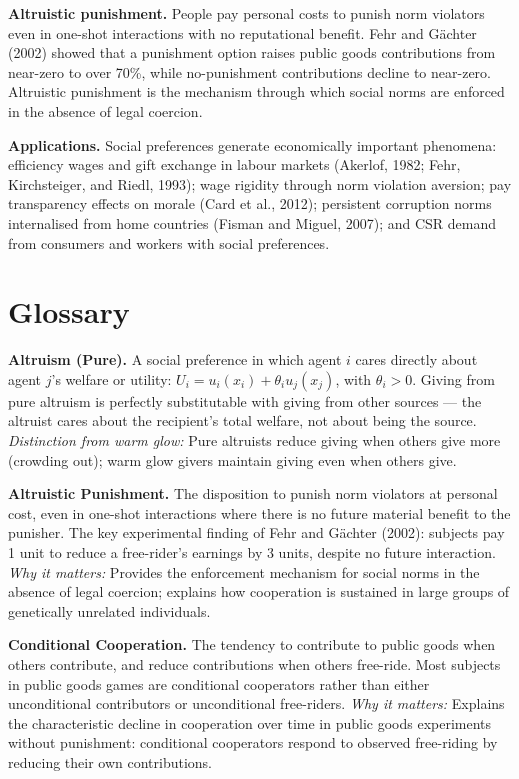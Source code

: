 \documentclass[12pt, letterpaper]{article}
\begin{document}
\textbf{Altruistic punishment.} People pay personal costs to punish norm violators even in one-shot interactions with no reputational benefit. Fehr and Gächter (2002) showed that a punishment option raises public goods contributions from near-zero to over 70\%, while no-punishment contributions decline to near-zero. Altruistic punishment is the mechanism through which social norms are enforced in the absence of legal coercion.

\textbf{Applications.} Social preferences generate economically important phenomena: efficiency wages and gift exchange in labour markets (Akerlof, 1982; Fehr, Kirchsteiger, and Riedl, 1993); wage rigidity through norm violation aversion; pay transparency effects on morale (Card et al., 2012); persistent corruption norms internalised from home countries (Fisman and Miguel, 2007); and CSR demand from consumers and workers with social preferences.
\newpage


\section*{Glossary}


\textbf{Altruism (Pure).} A social preference in which agent $i$ cares directly about agent $j$'s welfare or utility: $U_i = u_i(x_i) + \theta_i u_j(x_j)$, with $\theta_i > 0$. Giving from pure altruism is perfectly substitutable with giving from other sources --- the altruist cares about the recipient's total welfare, not about being the source. \textit{Distinction from warm glow:} Pure altruists reduce giving when others give more (crowding out); warm glow givers maintain giving even when others give.

\textbf{Altruistic Punishment.} The disposition to punish norm violators at personal cost, even in one-shot interactions where there is no future material benefit to the punisher. The key experimental finding of Fehr and Gächter (2002): subjects pay 1 unit to reduce a free-rider's earnings by 3 units, despite no future interaction. \textit{Why it matters:} Provides the enforcement mechanism for social norms in the absence of legal coercion; explains how cooperation is sustained in large groups of genetically unrelated individuals.

\textbf{Conditional Cooperation.} The tendency to contribute to public goods when others contribute, and reduce contributions when others free-ride. Most subjects in public goods games are conditional cooperators rather than either unconditional contributors or unconditional free-riders. \textit{Why it matters:} Explains the characteristic decline in cooperation over time in public goods experiments without punishment: conditional cooperators respond to observed free-riding by reducing their own contributions.
\end{document}
